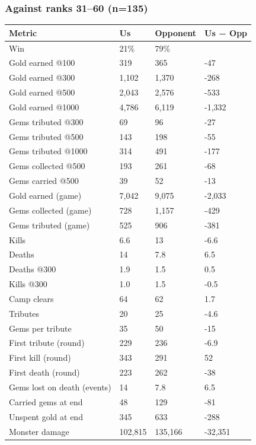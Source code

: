 \documentclass[
  10pt,
]{article}
\newcounter{none} %
\begin{document}
\subsubsection{Against ranks 31--60
(n=135)}\label{against-ranks-3160-n135}

{\def\LTcaptype{none} %
\begin{longtable}[]{@{}llll@{}}
\toprule\noalign{}
Metric & Us & Opponent & Us − Opp \\
\midrule\noalign{}
\endhead
\bottomrule\noalign{}
\endlastfoot
Win & 21\% & 79\% & \\
Gold earned @100 & 319 & 365 & -47 \\
Gold earned @300 & 1,102 & 1,370 & -268 \\
Gold earned @500 & 2,043 & 2,576 & -533 \\
Gold earned @1000 & 4,786 & 6,119 & -1,332 \\
Gems tributed @300 & 69 & 96 & -27 \\
Gems tributed @500 & 143 & 198 & -55 \\
Gems tributed @1000 & 314 & 491 & -177 \\
Gems collected @500 & 193 & 261 & -68 \\
Gems carried @500 & 39 & 52 & -13 \\
Gold earned (game) & 7,042 & 9,075 & -2,033 \\
Gems collected (game) & 728 & 1,157 & -429 \\
Gems tributed (game) & 525 & 906 & -381 \\
Kills & 6.6 & 13 & -6.6 \\
Deaths & 14 & 7.8 & 6.5 \\
Deaths @300 & 1.9 & 1.5 & 0.5 \\
Kills @300 & 1.0 & 1.5 & -0.5 \\
Camp clears & 64 & 62 & 1.7 \\
Tributes & 20 & 25 & -4.6 \\
Gems per tribute & 35 & 50 & -15 \\
First tribute (round) & 229 & 236 & -6.9 \\
First kill (round) & 343 & 291 & 52 \\
First death (round) & 223 & 262 & -38 \\
Gems lost on death (events) & 14 & 7.8 & 6.5 \\
Carried gems at end & 48 & 129 & -81 \\
Unspent gold at end & 345 & 633 & -288 \\
Monster damage & 102,815 & 135,166 & -32,351 \\

\end{longtable}}
\end{document}
